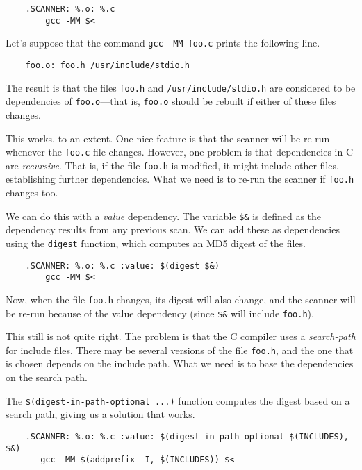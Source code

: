 \begin{verbatim}
    .SCANNER: %.o: %.c
        gcc -MM $<
\end{verbatim}

Let's suppose that the command \verb+gcc -MM foo.c+ prints the following line.

\begin{verbatim}
    foo.o: foo.h /usr/include/stdio.h
\end{verbatim}

The result is that the files \verb+foo.h+ and \verb+/usr/include/stdio.h+ are considered to be
dependencies of \verb+foo.o+---that is, \verb+foo.o+ should be rebuilt if either of these files
changes.

This works, to an extent.  One nice feature is that the scanner will be re-run whenever the
\verb+foo.c+ file changes.  However, one problem is that dependencies in C are \emph{recursive}.
That is, if the file \verb+foo.h+ is modified, it might include other files, establishing further
dependencies.  What we need is to re-run the scanner if \verb+foo.h+ changes too.

We can do this with a \emph{value} dependency.  The variable \verb+$&+ is defined as the dependency
results from any previous scan.  We can add these as dependencies using the \verb+digest+ function,
which computes an MD5 digest of the files.

\begin{verbatim}
    .SCANNER: %.o: %.c :value: $(digest $&)
        gcc -MM $<
\end{verbatim}

Now, when the file \verb+foo.h+ changes, its digest will also change, and the scanner will be re-run
because of the value dependency (since \verb+$&+ will include \verb+foo.h+).

This still is not quite right.  The problem is that the C compiler uses a \emph{search-path} for
include files.  There may be several versions of the file \verb+foo.h+, and the one that is chosen
depends on the include path.  What we need is to base the dependencies on the search path.

The \verb+$(digest-in-path-optional ...)+ function computes the digest based on a search path,
giving us a solution that works.

\begin{verbatim}
    .SCANNER: %.o: %.c :value: $(digest-in-path-optional $(INCLUDES), $&)
       gcc -MM $(addprefix -I, $(INCLUDES)) $<
\end{verbatim}

